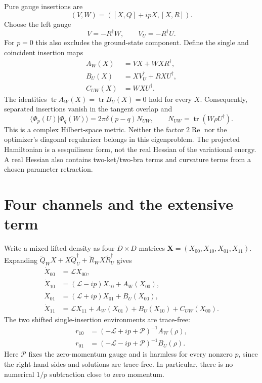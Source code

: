 \documentclass[11pt]{article}
\newcommand{\tr}{\operatorname{tr}}
\newcommand{\LL}{\mathcal{L}}
\newcommand{\PP}{\mathcal{P}}
\newcommand{\bra}[1]{\langle #1\rvert}
\begin{document}
Pure gauge insertions are
\begin{equation}
 (V,W)=([X,Q]+ipX,[X,R]).
\end{equation}
Choose the left gauge
\begin{equation}
 V=-R^\dagger W,\qquad V_U=-R^\dagger U.
 \label{eq:gauge}
\end{equation}
For $p=0$ this also excludes the ground-state component. Define the single
and coincident insertion maps
\begin{align}
 A_W(X)&=VX+WXR^\dagger,\\
 B_U(X)&=XV_U^\dagger+RXU^\dagger,\\
 C_{UW}(X)&=WXU^\dagger.
\end{align}
The identities $\tr A_W(X)=\tr B_U(X)=0$ hold for every $X$.
Consequently, separated insertions vanish in the tangent overlap and
\begin{equation}
 \bra{\Phi_p(U)}\Phi_q(W)\rangle
 =2\pi\delta(p-q)N_{UW},\qquad N_{UW}=\tr(W\rho U^\dagger).
 \label{eq:metric}
\end{equation}
This is a complex Hilbert-space metric. Neither the factor $2\operatorname{Re}$
nor the optimizer's diagonal regularizer belongs in this eigenproblem.
The projected Hamiltonian is a sesquilinear form, not the real Hessian of
the variational energy. A real Hessian also contains two-ket/two-bra terms
and curvature terms from a chosen parameter retraction.

\section{Four channels and the extensive term}
Write a mixed lifted density as four $D\times D$ matrices
$\bm X=(X_{00},X_{10},X_{01},X_{11})$. Expanding
$\widetilde Q_W X+X\widetilde Q_U^\dagger+
 \widetilde R_W X\widetilde R_U^\dagger$ gives
\begin{align}
 \dot X_{00}&=\LL X_{00},\\
 \dot X_{10}&=(\LL-ip)X_{10}+A_W(X_{00}),\\
 \dot X_{01}&=(\LL+ip)X_{01}+B_U(X_{00}),\\
 \dot X_{11}&=\LL X_{11}+A_W(X_{01})+B_U(X_{10})+C_{UW}(X_{00}).
 \label{eq:uncentered}
\end{align}
The two shifted single-insertion environments are trace-free:
\begin{align}
 r_{10}&=(-\LL+ip+\PP)^{-1}A_W(\rho),\\
 r_{01}&=(-\LL-ip+\PP)^{-1}B_U(\rho).
 \label{eq:singles}
\end{align}
Here $\PP$ fixes the zero-momentum gauge and is harmless for every nonzero
$p$, since the right-hand sides and solutions are trace-free. In particular,
there is no numerical $1/p$ subtraction close to zero momentum.
\end{document}
